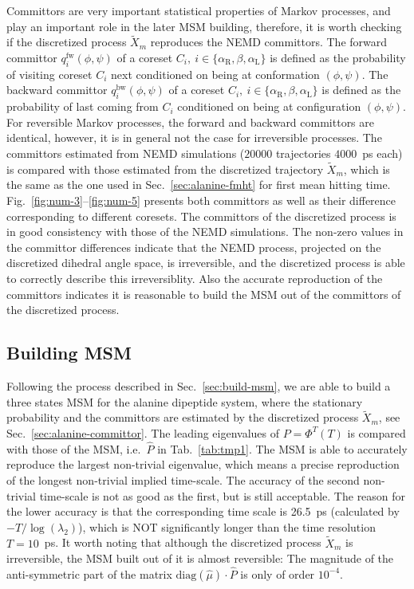 \documentclass[aps, pre, preprint,unsortedaddress,a4paper,onecolumn]{revtex4}
\newcommand{\fwd}[0]{\textrm{fw}}
\newcommand{\bwd}[0]{\textrm{bw}}
\newcommand{\confaa}[0]{{\alpha_{\textrm{R}}}}
\newcommand{\confc}[0]{{\alpha_{\textrm{L}}}}
\begin{document}
Committors are very important statistical properties of Markov processes, and play
an important role in the later MSM building, therefore, it is worth
checking if the discretized process $\tilde X_m$ reproduces the NEMD committors.
The forward committor $q^\fwd_i(\phi,\psi)$ of a coreset $C_i,\
i\in\{\confaa, \beta, \confc\}$ is defined as the probability of
visiting coreset $C_i$ next conditioned on being at conformation
$(\phi,\psi)$.  The backward committor $q^\bwd_i(\phi,\psi)$ of a
coreset $C_i,\ i\in\{\confaa, \beta, \confc\}$ is defined as the
probability of last coming from $C_i$ conditioned on being at
configuration $(\phi,\psi)$.
For reversible Markov processes, the
forward and backward committors are identical, however, it is in
general not the case for irreversible processes.
The committors estimated from NEMD simulations ($20000$ trajectories $4000$~ps each) is compared with
those estimated from the discretized trajectory $\tilde X_m$, which is the same as the one used in Sec.~\ref{sec:alanine-fmht} for first mean hitting time.
Fig.~\ref{fig:num-3}--\ref{fig:num-5} presents both
committors as well as their difference corresponding to different coresets.
The committors of the discretized process is in good consistency with those of
the NEMD simulations. The non-zero values in the committor differences
indicate that the NEMD process, projected on the discretized
dihedral angle space, is irreversible, and
the discretized process is able to correctly describe this irreversiblity.
Also the accurate reproduction of the committors indicates it is reasonable to build the 
MSM out of the committors of the  discretized process.

\subsection{Building MSM}
Following the process described in Sec.~\ref{sec:build-msm}, we are able to build a 
three states MSM for the alanine dipeptide system,
where the stationary probability and the committors are
estimated by the discretized process $\tilde X_m$, see
Sec.~\ref{sec:alanine-committor}.
The leading eigenvalues of $P=\Phi^T(T)$ is compared with those of the MSM, i.e.~$\hat P$ in
Tab.~\ref{tab:tmp1}.
The MSM is able to accurately reproduce
the largest non-trivial eigenvalue, which means a precise reproduction
of the longest non-trivial implied time-scale. The accuracy of the second non-trivial
time-scale is not as good as the first, but is still acceptable. The reason
for the lower accuracy is that
the corresponding time scale is 26.5~ps (calculated by $-T/\log(\lambda_2)$),
which is NOT significantly longer than the time resolution $T=10$~ps.
It worth noting that although the discretized process $\tilde X_m$ is irreversible,
the MSM built out of it is almost reversible:
The magnitude of the anti-symmetric part of the
matrix $\textrm{diag}(\hat \mu)\cdot \hat P$ is only of order $10^{-4}$.
\end{document}
